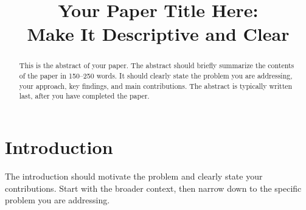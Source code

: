 \documentclass[10pt,conference]{IEEEtran}
\begin{document}
\title{Your Paper Title Here: \\
Make It Descriptive and Clear}

\author{
}

\maketitle

\begin{abstract}
This is the abstract of your paper. The abstract should briefly summarize the contents of the paper in 150--250 words. It should clearly state the problem you are addressing, your approach, key findings, and main contributions. The abstract is typically written last, after you have completed the paper.
\end{abstract}


\section{Introduction}
\label{sec:introduction}

The introduction should motivate the problem and clearly state your contributions. Start with the broader context, then narrow down to the specific problem you are addressing.
\end{document}
